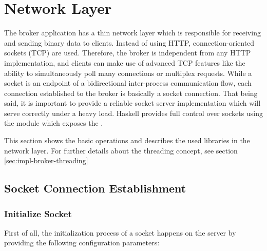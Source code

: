 \newpage
\section{Network Layer}
\label{sec:broker-network}

The broker application has a thin network layer which is responsible for
receiving and sending binary data to clients. Instead of using HTTP, 
connection-oriented sockets (TCP) are used. Therefore, the broker is independent
from any HTTP implementation, and clients can make use of advanced
TCP features like the ability to simultaneously poll many connections or 
multiplex requests. While a socket is an endpoint of a bidirectional
inter-process communication flow, each connection established to the broker is
basically a socket connection. That being said, it is important to provide a
reliable socket server implementation which will serve correctly under a heavy
load. Haskell provides full control over sockets using the
module which exposes the .

This section shows the basic operations and describes the used libraries in the
network layer. For further details about the threading concept, see section
\ref{sec:impl-broker-threading} 

\subsection{Socket Connection Establishment}
\label{sec:impl-broker-socket-connection}


\subsubsection{Initialize Socket}

First of all, the initialization process of a socket happens on the server by providing the following configuration parameters:

